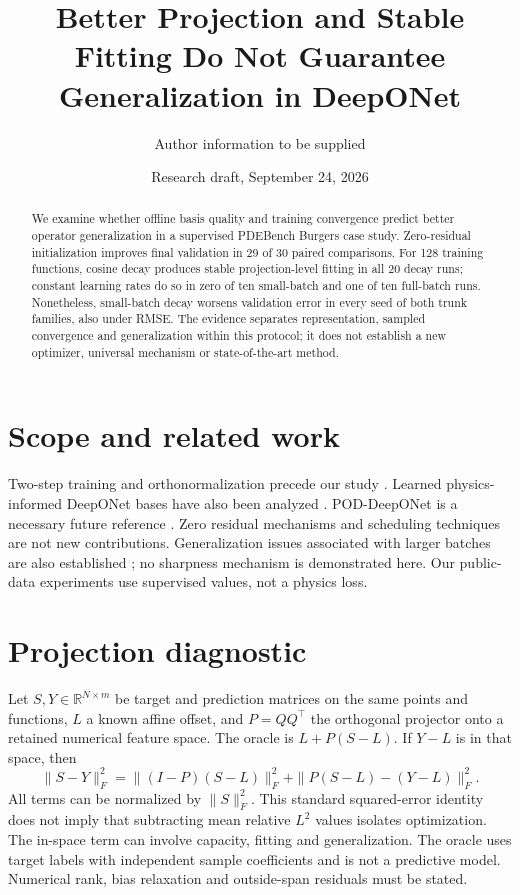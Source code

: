 \documentclass[10pt]{article}
\title{Better Projection and Stable Fitting Do Not Guarantee Generalization in DeepONet}
\author{Author information to be supplied}
\date{Research draft, September 24, 2026}
\begin{document}
\maketitle
\begin{abstract}
We examine whether offline basis quality and training convergence predict better
operator generalization in a supervised PDEBench Burgers case study. Zero-residual
initialization improves final validation in 29 of 30 paired comparisons.
For 128 training functions, cosine decay produces stable projection-level fitting
in all 20 decay runs; constant learning rates do so in zero of ten small-batch and
one of ten full-batch runs. Nonetheless, small-batch decay worsens validation error
in every seed of both trunk families, also under RMSE. The evidence separates
representation, sampled convergence and generalization within this protocol;
it does not establish a new optimizer, universal mechanism or state-of-the-art method.
\end{abstract}

\section{Scope and related work}
Two-step training and orthonormalization precede our study \cite{lee2023}.
Learned physics-informed DeepONet bases have also been analyzed \cite{williams2024}.
POD-DeepONet is a necessary future reference \cite{lu2022}.
Zero residual mechanisms \cite{rezero} and scheduling techniques \cite{sgdr} are not
new contributions. Generalization issues associated with larger batches are also
established \cite{keskar}; no sharpness mechanism is demonstrated here.
Our public-data experiments use supervised values, not a physics loss.

\section{Projection diagnostic}
Let $S,Y\in\mathbb{R}^{N\times m}$ be target and prediction matrices on the same
points and functions, $L$ a known affine offset, and $P=QQ^\top$ the orthogonal
projector onto a retained numerical feature space. The oracle is $L+P(S-L)$.
If $Y-L$ is in that space, then
\[
 \|S-Y\|_F^2=\|(I-P)(S-L)\|_F^2+
             \|P(S-L)-(Y-L)\|_F^2.
\]
All terms can be normalized by $\|S\|_F^2$. This standard squared-error identity
does not imply that subtracting mean relative $L^2$ values isolates optimization.
The in-space term can involve capacity, fitting and generalization. The oracle
uses target labels with independent sample coefficients and is not a predictive model.
Numerical rank, bias relaxation and outside-span residuals must be stated.
\end{document}
